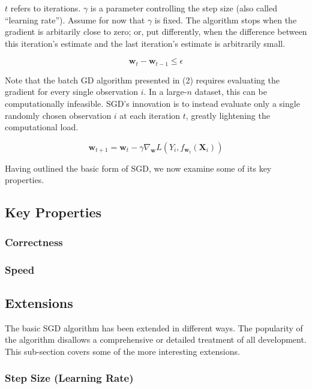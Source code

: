 \documentclass{article}
\begin{document}
$t$ refers to iterations. $\gamma$ is a parameter controlling the step
size (also called ``learning rate''). Assume for now that $\gamma$ is fixed. 
The algorithm stops when the gradient is
arbitarily close to zero; or, put differently, when the difference between this
iteration's estimate and the last iteration's estimate is arbitrarily small.

\begin{equation}
	\bm{w}_t - \bm{w}_{t-1} \leq \epsilon
\end{equation}

Note that the batch GD algorithm presented in (2) requires evaluating the
gradient for every single observation $i$. In a large-$n$ dataset, this can be
computationally infeasible. SGD's innovation is to instead evaluate only a
single randomly chosen observation $i$ at each iteration $t$, greatly lightening
the computational load.

\begin{equation}
	\bm{w}_{t+1} = \bm{w}_t - \gamma 
	\nabla_{\bm{w}}L(Y_i, f_{\bm{w}_t}(\bm{X}_i))
\end{equation}

Having outlined the basic form of SGD, we now examine some of its key
properties.

\subsection{Key Properties}

\subsubsection{Correctness}

\subsubsection{Speed}

\subsection{Extensions}

The basic SGD algorithm has been extended in different ways. The popularity of
the algorithm disallows a comprehensive or detailed treatment of all
development. This sub-section covers some of the more interesting extensions.

\cite{bottou2012stochastic}
\cite{boyd2004convex}
\cite{dal2015calibrating}
\subsubsection{Step Size (Learning Rate)}
\end{document}
